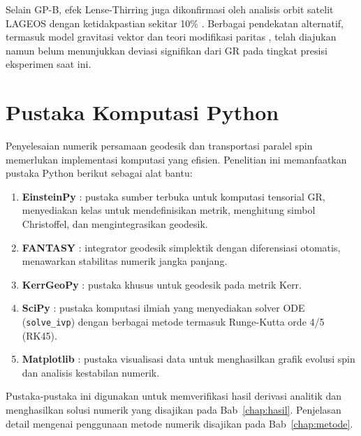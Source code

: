 Selain GP-B, efek Lense-Thirring juga dikonfirmasi oleh analisis orbit satelit LAGEOS dengan ketidakpastian sekitar 10\% \parencite{CiufoliniPavlis2004_LAGEOS}. Berbagai pendekatan alternatif, termasuk model gravitasi vektor \parencite{BeheraBarik2020} dan teori modifikasi paritas \parencite{Mao2006, Nakamura2018}, telah diajukan namun belum menunjukkan deviasi signifikan dari GR pada tingkat presisi eksperimen saat ini.


\section{Pustaka Komputasi Python}
\label{sec:pustaka-python}

Penyelesaian numerik persamaan geodesik dan transportasi paralel spin memerlukan implementasi komputasi yang efisien. Penelitian ini memanfaatkan pustaka Python berikut sebagai alat bantu:
\begin{enumerate}[label=(\roman*)]
    \item \textbf{EinsteinPy} \parencite{Bapat2020EinsteinPy}: pustaka sumber terbuka untuk komputasi tensorial GR, menyediakan kelas untuk mendefinisikan metrik, menghitung simbol Christoffel, dan mengintegrasikan geodesik.
    \item \textbf{FANTASY} \parencite{Christian2020FANTASY}: integrator geodesik simplektik dengan diferensiasi otomatis, menawarkan stabilitas numerik jangka panjang.
    \item \textbf{KerrGeoPy} \parencite{Park2024KerrGeoPy}: pustaka khusus untuk geodesik pada metrik Kerr.
    \item \textbf{SciPy} \parencite{SciPy2020}: pustaka komputasi ilmiah yang menyediakan solver ODE (\texttt{solve\_ivp}) dengan berbagai metode termasuk Runge-Kutta orde 4/5 (RK45).
    \item \textbf{Matplotlib} \parencite{Matplotlib2007}: pustaka visualisasi data untuk menghasilkan grafik evolusi spin dan analisis kestabilan numerik.
\end{enumerate}

Pustaka-pustaka ini digunakan untuk memverifikasi hasil derivasi analitik dan menghasilkan solusi numerik yang disajikan pada Bab~\ref{chap:hasil}. Penjelasan detail mengenai penggunaan metode numerik disajikan pada Bab~\ref{chap:metode}.
